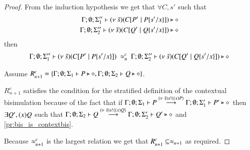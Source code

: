 \begin{proof}
	From the induction hypothesis we get that
	$\forall C, s'$
	such that
	\begin{eqnarray*}
		\Gamma; \emptyset; \Sigma_1'' \vdash (\nu\ \tilde{s})(C[P' \;|\; P \{s'/x \}]) \triangleright \diamond \\
		\Gamma; \emptyset; \Sigma_2'' \vdash (\nu\ \tilde{s})(C[Q' \;|\; Q \{s'/x \}]) \triangleright \diamond
	\end{eqnarray*}
	then
	\begin{eqnarray}
		\Gamma; \emptyset; \Sigma_1'' \proves \newsp{\tilde{s}}{\context{C}{P' \Par P \subst{s'}{x}}}\ \wbc_{n}\ 
		\Gamma; \emptyset; \Sigma_2'' \proves \newsp{\tilde{s}}{\context{C}{Q' \Par Q \subst{s'}{x}}} \hastype \Proc
		\label{pr:bis_is_contextbis}
	\end{eqnarray}


	Assume $R^c_{n+1} = \{\Gamma; \emptyset; \Sigma_1 \vdash P \triangleright \diamond, \Gamma; \emptyset; \Sigma_2 \vdash Q \triangleright \diamond\}$.

	$R^c_{n+1}$ satisfies the condition for the stratified definition of the contextual bisimulation because of the fact that
	if $\Gamma; \emptyset; \Sigma_1 \vdash P \stackrel{(\nu\ \tilde{s}) s ! \langle (x)P \rangle}{\longrightarrow} \Gamma; \emptyset; \Sigma_1' \vdash P' \triangleright \diamond$ then
	$\exists Q', (x)Q$ such that
	$\Gamma; \emptyset; \Sigma_2 \vdash Q \stackrel{(\nu\ \tilde{s}) s ! \langle (x)Q \rangle}{\longrightarrow} \Gamma; \emptyset; \Sigma_2' \vdash Q' \triangleright \diamond$
	and \ref{pr:bis_is_contextbis}.

	Because $\approx^{c}_{n+1}$ is the largest relation we get that $R^c_{n+1} \subseteq \approx_{n+1}$ as required.
	
\end{proof}







